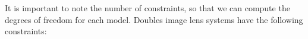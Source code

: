 It is important to note the number of constraints, so that we can compute the degrees of freedom for each model. Doubles image lens systems have the following constraints: